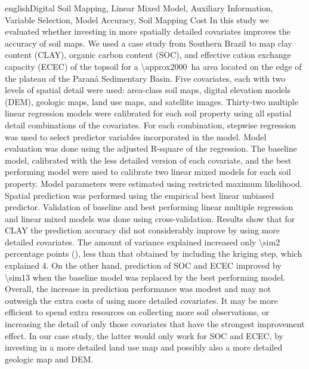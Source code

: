 \def\englishkeys{Digital Soil Mapping, Linear Mixed Model, Auxiliary Information, Variable Selection, Model
Accuracy, Soil Mapping Cost}
  
\begin{chapterabstract}{english}{\englishkeys}
In this study we evaluated whether investing in more spatially detailed covariates improves the accuracy of 
soil maps. We used a case study from Southern Brazil to map clay content (CLAY), organic carbon content (SOC), 
and effective cation exchange capacity (ECEC) of the topsoil for a \SI{\approx2000}{\hectare} area located on 
the edge of the plateau of the Paraná Sedimentary Basin. Five covariates, each with two levels of spatial 
detail were used: area-class soil maps, digital elevation models (DEM), geologic maps, land use maps, and 
satellite images. Thirty-two multiple linear regression models were calibrated for each soil property using all 
spatial detail combinations of the covariates. For each combination, stepwise regression was used to select 
predictor variables incorporated in the model. Model evaluation was done using the adjusted R-square of the 
regression. The baseline model, calibrated with the less detailed version of each covariate, and the best 
performing model were used to calibrate two linear mixed models for each soil property. Model parameters were 
estimated using restricted maximum likelihood. Spatial prediction was performed using the empirical best linear 
unbiased predictor. Validation of baseline and best performing linear multiple regression and linear mixed 
models was done using cross-validation. Results show that for CLAY the prediction accuracy did not considerably 
improve by using more detailed covariates. The amount of variance explained increased only \num{\sim2} 
percentage points (\si{\pp}), less than that obtained by including the kriging step, which explained 
\SI{4}{\pp}. On the other hand, prediction of SOC and ECEC improved by \SI{\sim13}{\pp} when the baseline model 
was replaced by the best performing model. Overall, the increase in prediction performance was modest and may 
not outweigh the extra costs of using more detailed covariates. It may be more efficient to spend extra 
resources on collecting more soil observations, or increasing the detail of only those covariates that have the 
strongest improvement effect. In our case study, the latter would only work for SOC and ECEC, by investing in 
a more detailed land use map and possibly also a more detailed geologic map and DEM.
\end{chapterabstract}

